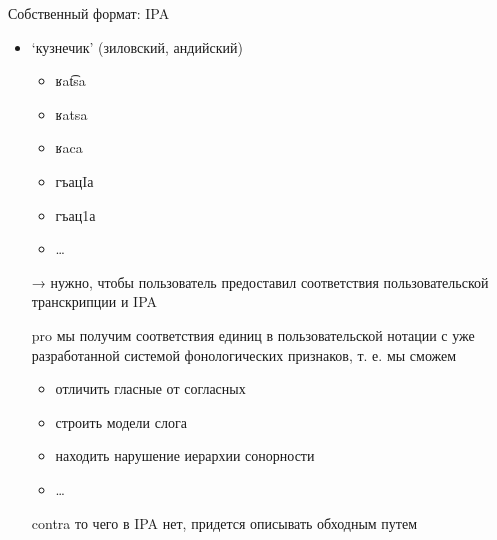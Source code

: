 \documentclass[13pt, t]{beamer}
\begin{document}
\begin{frame}{Собственный формат: IPA}
\begin{itemize}
\item `кузнечик' (зиловский, андийский)
\begin{itemize}
\item ʁat͡sa
\item ʁatsa
\item ʁaca
\item гъацIа
\item гъац1а
\item … \pause
\end{itemize}
\item[→] нужно, чтобы пользователь предоставил соответствия пользовательской транскрипции и IPA \pause
\item[pro] мы получим соответствия единиц в пользовательской нотации с уже разработанной системой фонологических признаков, т. е. мы сможем
\begin{itemize}
\item  отличить гласные от согласных
\item строить модели слога
\item находить нарушение иерархии сонорности
\item …
\end{itemize}
\item[contra] то чего в  IPA нет, придется описывать обходным путем
\end{itemize}
\end{frame}
\end{document}
